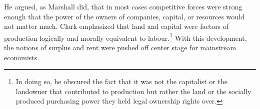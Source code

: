 He argued, as Marshall did, that in most cases competitive forces were strong enough that the power of the owners of companies, capital, or resources would not matter much. %
Clark emphasized that land and capital were factors of production logically and morally equivalent to labour.\footnote{In doing so, he obscured the fact that it was not the capitalist or the landowner that contributed to production but rather the land or the socially produced purchasing power they held legal ownership rights over.} With this development, the notions of surplus and rent were pushed off center stage for mainstream economists. %

